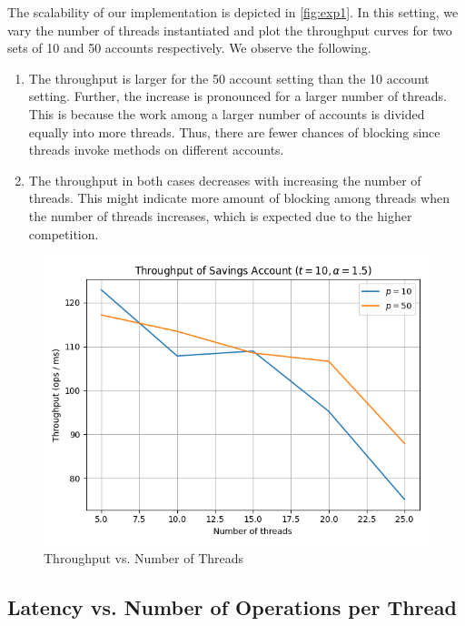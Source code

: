 \documentclass[conference,compsoc]{IEEEtran}
\begin{document}
The scalability of our implementation is depicted in \autoref{fig:exp1}. In this
setting, we vary the number of threads instantiated and plot the throughput
curves for two sets of 10 and 50 accounts respectively. We observe the
following.

\begin{enumerate}
    \item The throughput is larger for the 50 account setting than the 10
    account setting. Further, the increase is pronounced for a larger number of
    threads. This is because the work among a larger number of accounts is
    divided equally into more threads. Thus, there are fewer chances of blocking
    since threads invoke methods on different accounts.
    \item The throughput in both cases decreases with increasing the number of
    threads. This might indicate more amount of blocking among threads when the
    number of threads increases, which is expected due to the higher
    competition. 
\end{enumerate}

\begin{figure}[!ht]
    \centering
    \includegraphics[width=\columnwidth]{images/exp1.png}
    \caption{Throughput vs. Number of Threads}
    \label{fig:exp1}
\end{figure}

\subsection{Latency vs. Number of Operations per Thread}
\end{document}

